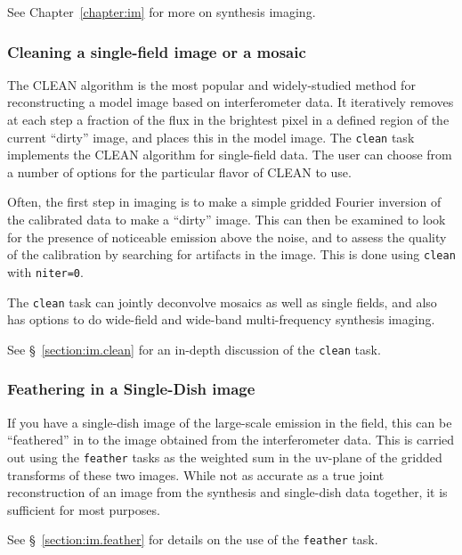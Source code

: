 See Chapter~\ref{chapter:im} for more on synthesis imaging.

\subsubsection{Cleaning a single-field image or a mosaic}
\label{section:intro.walkthru.image.clean}

The CLEAN algorithm is the most popular and widely-studied method for
reconstructing a model image based on interferometer data.  It 
iteratively removes at each step a fraction of the flux
in the brightest pixel in a defined region of the current ``dirty'' 
image, and places this in the model image.  The
{\tt clean} task implements the CLEAN algorithm for single-field
data.  The user can choose from a number of options for the particular 
flavor of CLEAN to use.

Often, the first step in imaging is to make a simple gridded Fourier
inversion of the calibrated data to make a ``dirty'' image.  This
can then be examined to look for the presence of noticeable emission
above the noise, and to assess the quality of the calibration by 
searching for artifacts in the image.  This is done using {\tt clean}
with {\tt niter=0}.

The {\tt clean} task can jointly deconvolve mosaics as well as single
fields, and also has options to do wide-field and wide-band
multi-frequency synthesis imaging.

See \S~\ref{section:im.clean} for an in-depth discussion of the
{\tt clean} task.

\subsubsection{Feathering in a Single-Dish image}
\label{section:intro.walkthru.image.feather}

If you have a single-dish image of the large-scale emission in the
field, this can be ``feathered'' in to the image obtained from
the interferometer data.  This is carried out using the 
{\tt feather} tasks as the weighted sum in the uv-plane of the gridded
transforms of these two images.  While not as accurate as a true
joint reconstruction of an image from the synthesis and single-dish
data together, it is sufficient for most purposes.

See \S~\ref{section:im.feather} for details on the use of the
{\tt feather} task.

